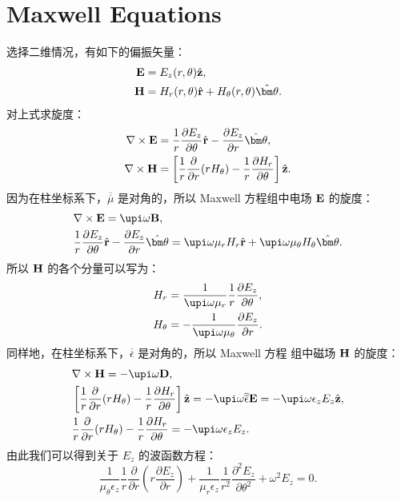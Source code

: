 \chapter{Maxwell Equations}

选择二维情况，有如下的偏振矢量：
\begin{subequations}
  \begin{align}
    {\bf E} &= E_z(r, \theta) \hat{\bf z}, \\
    {\bf H} &= H_r(r, \theta) \hat{\bf r} + H_\theta(r, \theta) \hat{\bm\theta}.
  \end{align}
\end{subequations}
对上式求旋度：
\begin{subequations}
  \begin{align}
    \nabla \times {\bf E} &= \frac{1}{r} \frac{\partial E_z}{\partial\theta}
      \hat{\bf r} - \frac{\partial E_z}{\partial r} \hat{\bm\theta}, \\
    \nabla \times {\bf H} &= \left[\frac{1}{r} \frac{\partial}{\partial r}
      (r H_\theta) - \frac{1}{r} \frac{\partial H_r}{\partial\theta} \right]
      \hat{\bf z}.
  \end{align}
\end{subequations}
因为在柱坐标系下，$\overline{\overline\mu}$ 是对角的，所以 Maxwell 方程组中电场
$\bf E$ 的旋度：
\begin{subequations}
  \begin{align}
    & \nabla \times {\bf E} = \upi \omega {\bf B}, \\
    & \frac{1}{r} \frac{\partial E_z}{\partial\theta} \hat{\bf r} -
      \frac{\partial E_z}{\partial r}\hat{\bm\theta} = \upi \omega \mu_r H_r
      \hat{\bf r} + \upi \omega \mu_\theta H_\theta \hat{\bm\theta}.
  \end{align}
\end{subequations}
所以 $\bf H$ 的各个分量可以写为：
\begin{subequations}
  \begin{align}
    H_r &= \frac{1}{\upi \omega \mu_r} \frac{1}{r}
      \frac{\partial E_z}{\partial\theta}, \\
    H_\theta &= -\frac{1}{\upi \omega \mu_\theta}
      \frac{\partial E_z}{\partial r}.
  \end{align}
\end{subequations}
同样地，在柱坐标系下，$\overline{\overline\epsilon}$ 是对角的，所以 Maxwell 方程
组中磁场 $\bf H$ 的旋度：
\begin{subequations}
  \begin{align}
    & \nabla \times {\bf H} = -\upi \omega {\bf D}, \\
    & \left[\frac{1}{r} \frac{\partial}{\partial r}(r H_\theta) - \frac{1}{r}
      \frac{\partial H_r}{\partial\theta} \right] \hat{\bf z} = -\upi \omega
      {\overline{\overline\epsilon}} {\bf E} = -\upi \omega \epsilon_z E_z
      \hat{\bf z}, \\
    & \frac{1}{r} \frac{\partial}{\partial r}(r H_\theta) - \frac{1}{r}
      \frac{\partial H_r}{\partial\theta} = -\upi \omega \epsilon_z E_z.
  \end{align}
\end{subequations}
由此我们可以得到关于 $E_z$ 的波函数方程：
\begin{equation}
  \frac{1}{\mu_\theta \epsilon_z} \frac{1}{r} \frac{\partial}{\partial r}
  \left(r \frac{\partial E_z}{\partial r} \right) + \frac{1}{\mu_r \epsilon_z}
  \frac{1}{r^2} \frac{\partial^2E_z}{\partial\theta^2} +\omega^2 E_z = 0.
\end{equation}
